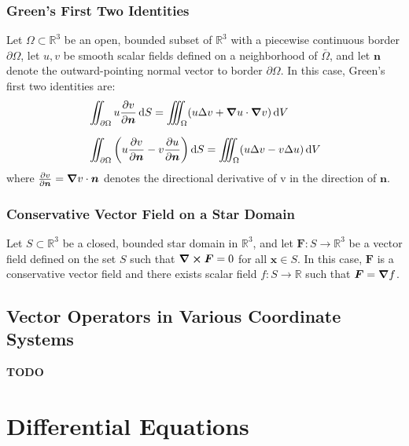 \documentclass[11pt, a4paper]{article}
\newcommand{\diff}{\mathop{}\!\mathrm{d}} %
\newcommand{\R}{\mathbb{R}} %
\begin{document}
\subsubsection{Green's First Two Identities}
Let $ \Omega \subset \R^3 $ be an open, bounded subset of $ \R^3 $ with a piecewise continuous border $ \partial \Omega $, let $ u, v $ be smooth scalar fields defined on a neighborhood of $ \bar{\Omega} $, and let $ \bm{n} $ denote the outward-pointing normal vector to border $ \partial \Omega $. In this case, Green's first two identities are:
\begin{align*}
	&\iint_{\partial \Omega} u \pdv{v}{\bm{n}} \diff S = \iiint_{\Omega} (u \Delta v + \grad{u} \cdot \grad{v}) \diff V\\[1.5ex]
	&\iint_{\partial \Omega}\left(u\pdv{v}{\bm{n}} - v \pdv{u}{\bm{n}} \right) \diff S = \iiint_{\Omega} (u \Delta v - v\Delta u) \diff V
\end{align*}
where $ \pdv{v}{\bm{n}} = \grad{v} \cdot \bm{n} $ denotes the directional derivative of v in the direction of $ \bm{n} $.

\subsubsection{Conservative Vector Field on a Star Domain} 
Let $ S \subset \R^3 $ be a closed, bounded star domain in $ \R^3 $, and let $ \bm{F} : S \to \R^3 $ be a vector field defined on the set $ S $ such that $ \curl{\bm{F}} = 0 $ for all $ \bm{x} \in S $. In this case, $ \bm{F} $ is a conservative vector field and there exists scalar field $ f : S \to \R $ such that $ \bm{F} = \grad{f} $.

\subsection{Vector Operators in Various Coordinate Systems}

\textbf{TODO}


\newpage 
\section{Differential Equations}
\end{document}
